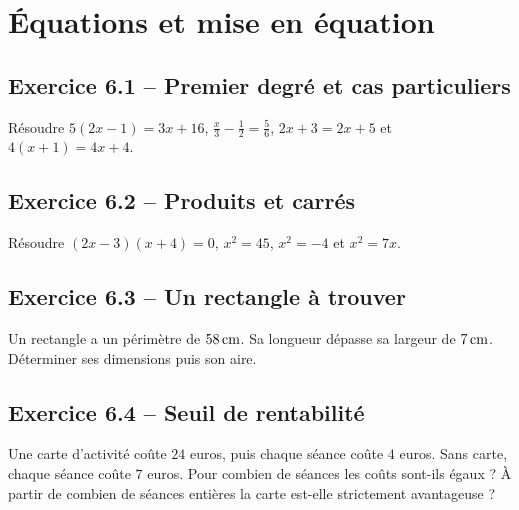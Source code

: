 \chapter{Équations et mise en équation}
\label{exercices:06}
\section*{Exercice 6.1 -- Premier degré et cas particuliers}
Résoudre $5(2x-1)=3x+16$, $\frac x3-\frac12=\frac56$, $2x+3=2x+5$ et $4(x+1)=4x+4$.

\section*{Exercice 6.2 -- Produits et carrés}
Résoudre $(2x-3)(x+4)=0$, $x^2=45$, $x^2=-4$ et $x^2=7x$.

\section*{Exercice 6.3 -- Un rectangle à trouver}
Un rectangle a un périmètre de $58\,\mathrm{cm}$. Sa longueur dépasse sa largeur de $7\,\mathrm{cm}$. Déterminer ses dimensions puis son aire.

\section*{Exercice 6.4 -- Seuil de rentabilité}
Une carte d'activité coûte $24$ euros, puis chaque séance coûte $4$ euros. Sans carte, chaque séance coûte $7$ euros. Pour combien de séances les coûts sont-ils égaux ? À partir de combien de séances entières la carte est-elle strictement avantageuse ?
